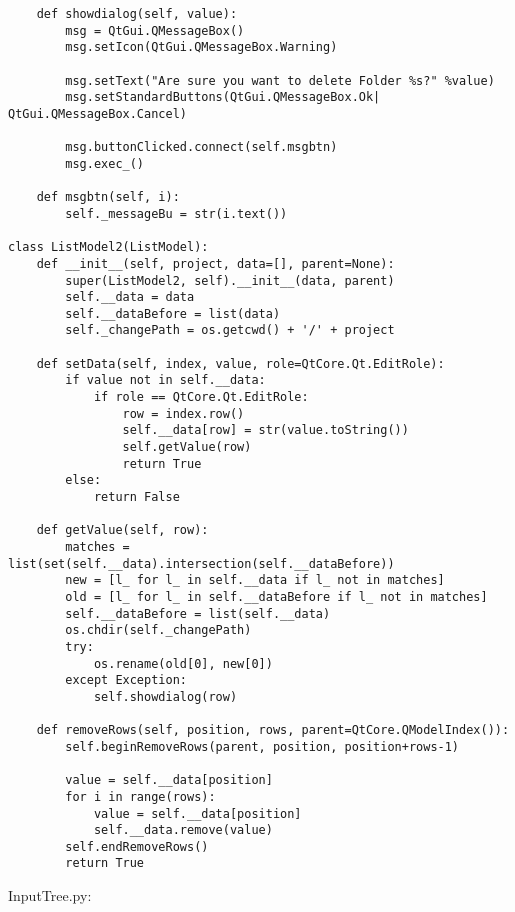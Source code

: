 \begin{verbatim}
    def showdialog(self, value):
        msg = QtGui.QMessageBox()
        msg.setIcon(QtGui.QMessageBox.Warning)

        msg.setText("Are sure you want to delete Folder %s?" %value)
        msg.setStandardButtons(QtGui.QMessageBox.Ok| QtGui.QMessageBox.Cancel)

        msg.buttonClicked.connect(self.msgbtn)
        msg.exec_()

    def msgbtn(self, i):
        self._messageBu = str(i.text())
        
class ListModel2(ListModel):  
    def __init__(self, project, data=[], parent=None):
        super(ListModel2, self).__init__(data, parent)
        self.__data = data
        self.__dataBefore = list(data)
        self._changePath = os.getcwd() + '/' + project

    def setData(self, index, value, role=QtCore.Qt.EditRole):
        if value not in self.__data:
            if role == QtCore.Qt.EditRole:
                row = index.row()
                self.__data[row] = str(value.toString())
                self.getValue(row)
                return True
        else:
            return False

    def getValue(self, row):
        matches = list(set(self.__data).intersection(self.__dataBefore))
        new = [l_ for l_ in self.__data if l_ not in matches]
        old = [l_ for l_ in self.__dataBefore if l_ not in matches]
        self.__dataBefore = list(self.__data)
        os.chdir(self._changePath)
        try:
            os.rename(old[0], new[0])
        except Exception:
            self.showdialog(row)

    def removeRows(self, position, rows, parent=QtCore.QModelIndex()):
        self.beginRemoveRows(parent, position, position+rows-1)

        value = self.__data[position]
        for i in range(rows):    
            value = self.__data[position]   
            self.__data.remove(value)
        self.endRemoveRows()
        return True
\end{verbatim}

InputTree.py:


